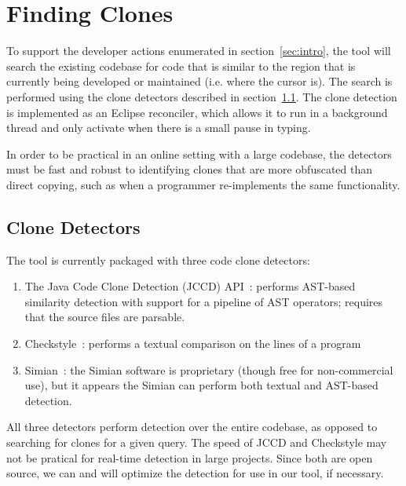 \documentclass[preprint,10pt]{sigplanconf}
\begin{document}
\section{Finding Clones}



To support the developer actions enumerated in section~\ref{sec:intro},
the tool will search the existing codebase for code
that is similar to the region that is currently being developed or maintained
(i.e. where the cursor is). The search is performed using the clone detectors
described in section~\ref{sec:detectors}. The clone detection is implemented as
an Eclipse reconciler, which allows it to run in a background thread and only activate 
when there is a small pause in typing.

In order to be practical in an online
setting with a large codebase, the detectors must be
fast and
robust to identifying clones that are more obfuscated than direct
copying, such as when a programmer re-implements the same
functionality.

\subsection{Clone Detectors}
\label{sec:detectors}
The tool is currently packaged with three code clone detectors:

\begin{enumerate}
\item The Java Code Clone Detection (JCCD) API~\cite{JCCD}: performs
  AST-based similarity detection with support for a pipeline of AST
  operators; requires that the source files are parsable.
\item Checkstyle~\cite{CheckStyle}: performs a textual comparison on
  the lines of a program
\item Simian~\cite{Simian}: the Simian software is proprietary (though
  free for non-commercial use), but it appears the Simian can perform
  both textual and AST-based detection.
\end{enumerate}

All three detectors perform detection over the entire codebase, as
opposed to searching for clones for a given query. The speed of JCCD
and Checkstyle may not be pratical for real-time detection in large
projects. Since both are open source, we can and will optimize the
detection for use in our tool, if necessary.  
\end{document}
